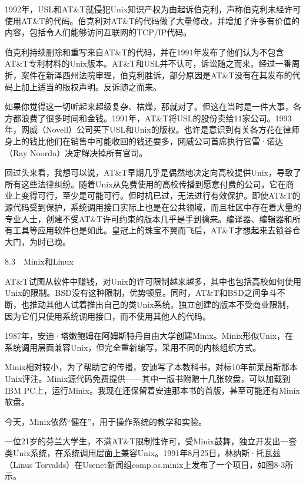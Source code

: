 \documentclass[a4paper,12pt,UTF8,twoside]{ctexbook}
\begin{document}
1992年，USL和AT\&T就侵犯Unix知识产权为由起诉伯克利，声称伯克利未经许可使用AT\&T的代码。伯克利对AT\&T的代码做了大量修改，并增加了许多有价值的内容，包括令人们能够访问互联网的TCP/IP代码。

伯克利持续删除和重写来自AT\&T的代码，并在1991年发布了他们认为不包含AT\&T专利材料的Unix版本。AT\&T和USL并不认可，诉讼随之而来。经过一番周折，案件在新泽西州法院审理，伯克利胜诉，部分原因是AT\&T没有在其发布的代码上加上适当的版权声明。反诉随之而来。

如果你觉得这一切听起来超级复杂、枯燥，那就对了。但这在当时是一件大事，各方都浪费了很多时间和金钱。1991年，AT\&T将USL的股份卖给11家公司。1993年，网威（Novell）公司买下USL和Unix的版权。也许是意识到有关各方花在律师身上的钱比他们在销售中可能收回的钱还要多，网威公司首席执行官雷·诺达（Ray Noorda）决定解决掉所有官司。

回过头来看，我想可以说，AT\&T早期几乎是偶然地决定向高校提供Unix，导致了所有这些法律纠纷。随着Unix从免费使用的高校传播到愿意付费的公司，它在商业上变得可行，至少是可能可行。但时机已过，无法进行有效保护。即使AT\&T的源代码受到保护，系统调用接口实际上也是在公共领域，而且社区中存在着大量的专业人士，创建不受AT\&T许可约束的版本几乎是手到擒来。编译器、编辑器和所有工具等应用软件也是如此。皇冠上的珠宝不翼而飞后，AT\&T才想起来去锁谷仓大门，为时已晚。





8.3　Minix和Linux


AT\&T试图从软件中赚钱，对Unix的许可限制越来越多，其中也包括高校如何使用Unix的限制。BSD没有这种限制，优势顿显。同时，AT\&T和BSD之间争斗不断，也推动其他人试着推出自己的类Unix系统。独立创建的版本不受商业限制，因为它们只使用系统调用接口，而不使用其他人的代码。

1987年，安迪·塔嫩鲍姆在阿姆斯特丹自由大学创建Minix。Minix形似Unix，在系统调用层面兼容Unix，但完全重新编写，采用不同的内核组织方式。

Minix相对较小，为了帮助它的传播，安迪写了本教科书，对标10年前莱昂斯那本Unix评注。Minix源代码免费提供——其中一版书附赠十几张软盘，可以加载到IBM PC上，运行Minix。我现在还保留着安迪那本书的首版，甚至可能还有Minix软盘。

今天，Minix依然“健在”，用于操作系统的教学和实验。

一位21岁的芬兰大学生，不满AT\&T限制性许可，受Minix鼓舞，独立开发出一套类Unix系统，在系统调用层面上兼容Unix。1991年8月25日，林纳斯·托瓦兹（Linus Torvalds）在Usenet新闻组comp.os.minix上发布了一个项目，如图8-3所示。
\end{document}
